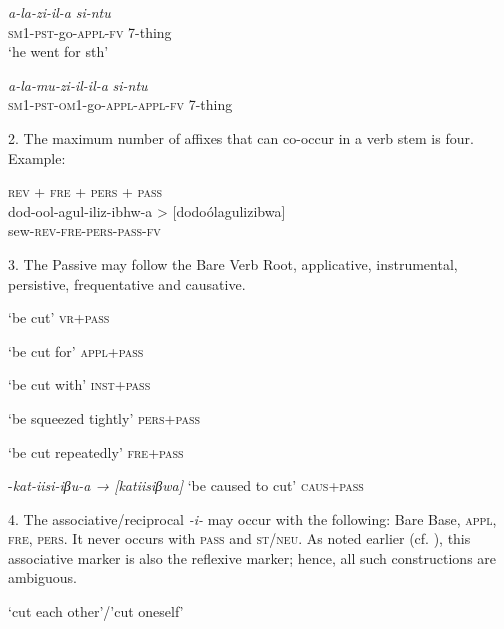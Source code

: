 \documentclass[output=paper		  ]{langscibook}
\begin{document}
    \ex\label{ex:kahigi:46b} \gll \textit{a-la-zi-il-a}               \textit{si-ntu}\\
 \textsc{sm1-pst-}go\textsc{-appl-fv}  7-thing\\
 \glt ‘he went for sth’

    \ex\label{ex:kahigi:46c} \gll \textit{a-la-mu-zi-il-il-a}                   \textit{si-ntu}\\
 \textsc{sm1-pst-om1-}go-\textsc{appl-appl-fv}  7-thing\\
    \z
\z

{2. The maximum number of affixes that can co-occur in a verb stem is four. Example:}

\ea\label{ex:kahigi:47}   \textsc{rev + fre + pers + pass} \\
\gll dod-ool-agul-iliz-ibhw-a > [dodoólagulizibwa]\\
 sew-\textsc{rev-fre-pers-pass-fv} \\
\z

{3. The Passive may follow the Bare Verb Root, applicative, instrumental, persistive, frequentative and causative.}

\ea\label{ex:kahigi:48}
     {‘be cut’              \hfill\textsc{vr+pass}}

     {‘be cut for’          \hfill\textsc{appl+pass}}

     {‘be cut with’        \hfill\textsc{inst+pass}}

     {‘be squeezed tightly’  \hfill\textsc{pers+pass}}

     {‘be cut repeatedly’    \hfill\textsc{fre+pass}}

    \ex -{\textit{kat-iisi-iβu-a  → [katiisiβwa]}} {‘be caused to cut’    \hfill\textsc{caus+pass}}
    \z
\z

{4. The associative/reciprocal} {\textit{{}-i-}} {may occur with the following: Bare Base, \textsc{appl, fre, pers}. It never occurs with \textsc{pass} and \textsc{st/neu}. As noted earlier (cf. ), this associative marker is also the reflexive marker; hence, all such constructions are ambiguous.}

\newpage
\ea\label{ex:kahigi:49}
     {‘cut each other’/’cut oneself’}
\end{document}
